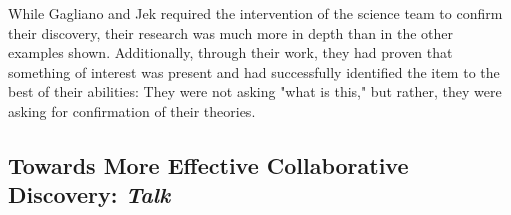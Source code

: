 \documentclass{sigchi}
\begin{document}
While Gagliano and Jek required the intervention of the science team to confirm their discovery, their research was much more in depth than in the other examples shown. Additionally, through their work, they had proven that something of interest was present and had successfully identified the item to the best of their abilities: They were not asking "what is this," but rather, they were asking for confirmation of their theories. 

\subsection{Towards More Effective Collaborative Discovery: \emph{Talk}}


\end{document}
